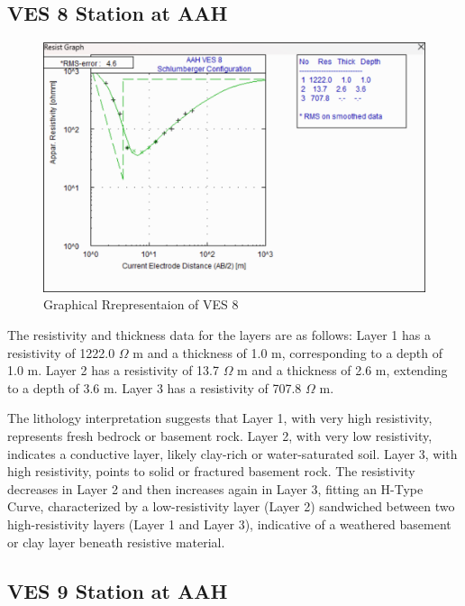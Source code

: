 \documentclass[12pt,a4paper]{report}
\begin{document}
\subsection{VES 8 Station at AAH}

\begin{figure}[H]
    \centering
    \includegraphics[width=1.0\textwidth]{aah_ves8.png}
    \caption{Graphical Rrepresentaion of VES 8}
    \label{fig:AAH_VES_8_Curve}
\end{figure}
The resistivity and thickness data for the layers are as follows: Layer 1 has a resistivity of 1222.0 $\Omega$ m and a thickness of 1.0 m, corresponding to a depth of 1.0 m. Layer 2 has a resistivity of 13.7 $\Omega$ m and a thickness of 2.6 m, extending to a depth of 3.6 m. Layer 3 has a resistivity of 707.8 $\Omega$ m.

The lithology interpretation suggests that Layer 1, with very high resistivity, represents fresh bedrock or basement rock. Layer 2, with very low resistivity, indicates a conductive layer, likely clay-rich or water-saturated soil. Layer 3, with high resistivity, points to solid or fractured basement rock. The resistivity decreases in Layer 2 and then increases again in Layer 3, fitting an H-Type Curve, characterized by a low-resistivity layer (Layer 2) sandwiched between two high-resistivity layers (Layer 1 and Layer 3), indicative of a weathered basement or clay layer beneath resistive material.

\subsection{VES 9 Station at AAH}
\end{document}
